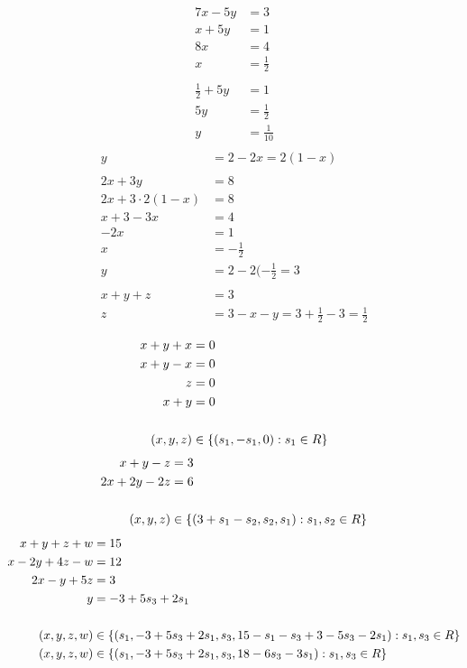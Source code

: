 \begin{align*}
  7x-5y &= 3\\
  x+5y &= 1\\
  8x &= 4\\
  x &= \frac{1}{2}\\
\\
  \frac{1}{2} + 5y &= 1\\
  5y&= \frac{1}{2}\\
  y&= \frac{1}{10}\\
\end{align*}
\begin{align*}
  y &= 2-2x=2(1-x)\\
\\
  2x + 3y &= 8\\
  2x + 3\cdot 2(1-x) &= 8\\
  x + 3-3x &= 4\\
  -2x &= 1\\
  x &= -\frac{1}{2}\\
  y &= 2-2(-\frac{1}{2} = 3\\
  \\
  x+y+z &= 3\\
  z &= 3-x-y = 3+\frac{1}{2}-3=\frac{1}{2}\\
\end{align*}
\begin{align*}
  x+y+x &= 0\\
  x+y-x &= 0\\
  z &= 0\\
  x+y&=0\\
\\
  (x,y,z) &\in \left\{ (s_1, -s_1, 0) : s_1 \in R \right \}\\
\end{align*}
\begin{align*}
  x+y-z &= 3\\
  2x+2y-2z &= 6\\
  \\
  (x,y,z) &\in \left\{ (3+s_1-s_2, s_2, s_1) : s_1, s_2 \in R \right \}\\ 
\end{align*}
\begin{align*}
  x+y+z+w &= 15\\
  x-2y+4z-w &= 12\\
  2x-y+5z &= 3\\
  y&= -3+5s_3+2s_1\\
  \\
  (x,y,z,w) &\in \left\{ (s_1, -3+5s_3+2s_1, s_3, 15-s_1-s_3+3-5s_3-2s_1): s_1,s_3 \in R \right \}\\
  (x,y,z,w) &\in \left\{ (s_1, -3+5s_3+2s_1, s_3, 18-6s_3-3s_1): s_1,s_3 \in R \right \}              
\end{align*}
